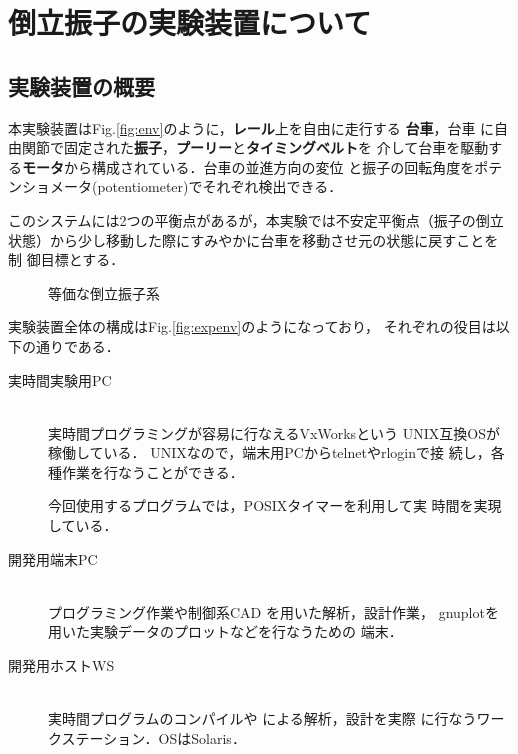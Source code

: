 \chapter{倒立振子の実験装置について}
\section{実験装置の概要}
本実験装置はFig.\ref{fig:env}のように，{\bf レール}上を自由に走行する{\bf
台車}，台車
に自由関節で固定された{\bf 振子}，{\bf プーリー}と{\bf タイミングベルト}を
介して台車を駆動する{\bf モータ}から構成されている．台車の並進方向の変位
と振子の回転角度をポテンショメータ(potentiometer)でそれぞれ検出できる．

このシステムには2つの平衡点があるが，本実験では不安定平衡点（振子の倒立
状態）から少し移動した際にすみやかに台車を移動させ元の状態に戻すことを制
御目標とする．

\begin{figure}[htbp]
 \begin{minipage}{0.5\textwidth}
  \begin{center}
  \end{center}
  \caption{実験装置の概要}
  \label{fig:env}
 \end{minipage}%
 \begin{minipage}{0.5\textwidth}
  \begin{center}
   
  \end{center}
  \caption{等価な倒立振子系}
  \label{fig:equivenv}
 \end{minipage}
\end{figure}

実験装置全体の構成はFig.\ref{fig:expenv}のようになっており，
それぞれの役目は以下の通りである．
\begin{description}
 \item[実時間実験用PC] \mbox{} \\
	    実時間プログラミングが容易に行なえる{\sf VxWorks}という
	    {\sf UNIX}互換{\sf OS}が稼働している．
	    {\sf UNIX}なので，端末用PCから{\sf telnet}や{\sf rlogin}で接
	    続し，各種作業を行なうことができる．
	    
	    今回使用するプログラムでは，{\sf POSIX}タイマーを利用して実
	    時間を実現している．
%
 \item[開発用端末PC] \mbox{} \\
	    プログラミング作業や制御系CAD \MaTX を用いた解析，設計作業，
	    {\sf gnuplot}を用いた実験データのプロットなどを行なうための
	    端末．
%
 \item[開発用ホストWS] \mbox{} \\
	    実時間プログラムのコンパイルや \MaTX による解析，設計を実際
	    に行なうワークステーション．{\sf OS}は{\sf Solaris}．
\end{description}

